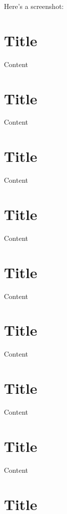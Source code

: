 \documentclass[
]{book}
\begin{document}
Here's a screenshot:

\hypertarget{title}{%
\chapter{Title}\label{title}}

Content

\hypertarget{title-1}{%
\chapter{Title}\label{title-1}}

Content

\hypertarget{title-2}{%
\chapter{Title}\label{title-2}}

Content

\hypertarget{title-3}{%
\chapter{Title}\label{title-3}}

Content

\hypertarget{title-4}{%
\chapter{Title}\label{title-4}}

Content

\hypertarget{title-5}{%
\chapter{Title}\label{title-5}}

Content

\hypertarget{title-6}{%
\chapter{Title}\label{title-6}}

Content

\hypertarget{title-7}{%
\chapter{Title}\label{title-7}}

Content

\hypertarget{title-8}{%
\chapter{Title}\label{title-8}}
\end{document}
